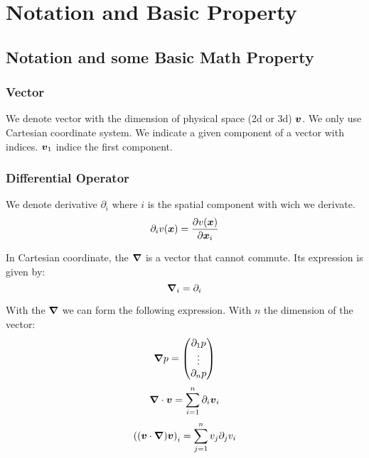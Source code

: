\chapter{Notation and Basic Property}
\minitoc

\section{Notation and some Basic Math Property}

\subsection{Vector}

We denote vector with the dimension of physical space (2d or 3d) ${\boldsymbol {v}}$.
We only use Cartesian coordinate system.
We indicate a given component of a vector with indices. ${\boldsymbol {v}}_1$ indice the first component.

\subsection{Differential Operator}

We denote derivative  $\partial_i$ where $i$ is the spatial component with wich we derivate.
\begin{equation}
 \partial_i v({\boldsymbol {x}})=\frac{\partial v({\boldsymbol {x}})}{\partial {\boldsymbol {x}}_{i}}
\end{equation}

\begin{definition}[Nabla]
 In Cartesian coordinate, the ${\boldsymbol {\nabla}}$ is a vector that cannot commute.
 Its expression is given by:
 \begin{equation}
 {\boldsymbol {\nabla}}_{i}=\partial_{i}
 \end{equation}
\end{definition}

With the ${\boldsymbol {\nabla}}$ we can form the following expression.
With $n$ the dimension of the vector:
\begin{equation}
 {\boldsymbol {\nabla}}p=\begin{pmatrix}\partial_1 p\\ \vdots \\ \partial_n p\end{pmatrix}
\end{equation}
\begin{equation}
 {\boldsymbol {\nabla}}\cdot {\boldsymbol {v}}=\sum_{i=1}^{n}\partial_i {\boldsymbol {v}}_i
\end{equation}
\begin{equation}
 \left(({\boldsymbol {v}}\cdot{\boldsymbol {\nabla}}){\boldsymbol {v}}\right)_{i}=\sum_{j=1}^{n}v_{j}\partial_{j} v_{i}
\end{equation}


